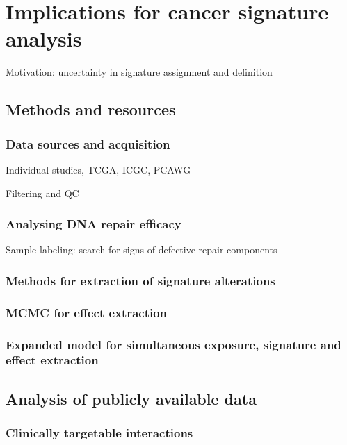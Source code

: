 


\pagestyle{empty}
\section{Implications for cancer signature analysis}

Motivation: uncertainty in signature assignment and definition


\subsection{Methods and resources}

\subsubsection{Data sources and acquisition}

Individual studies, TCGA, ICGC, PCAWG

Filtering and QC

\subsubsection{Analysing DNA repair efficacy}

Sample labeling: search for signs of defective repair components

\subsubsection{Methods for extraction of signature alterations}

\subsubsection*{MCMC for effect extraction}

\subsubsection*{Expanded model for simultaneous exposure, signature and effect extraction}



\subsection{Analysis of publicly available data}

\subsubsection{Clinically targetable interactions}

